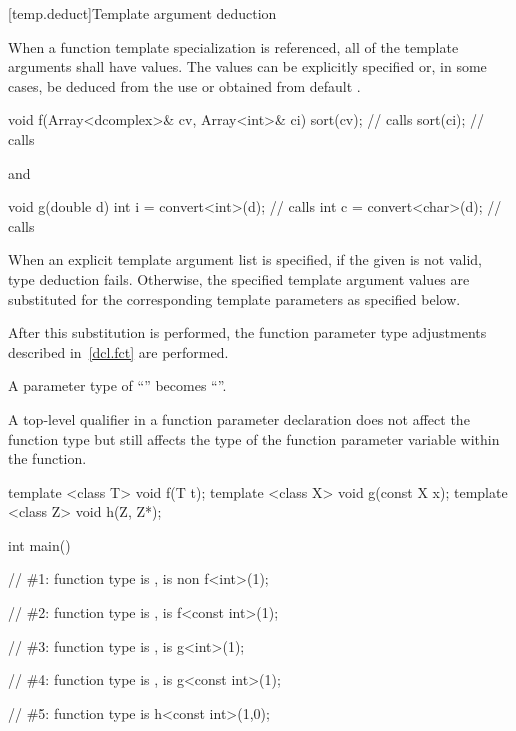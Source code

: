 [temp.deduct]{Template argument deduction}

\pnum
When a
function template
specialization is referenced, all of the
template arguments shall have values.
The values can be
explicitly specified or, in some cases, be deduced from the use
or obtained from default
.
\begin{example}
\begin{codeblock}
void f(Array<dcomplex>& cv, Array<int>& ci) {
  sort(cv);                     // calls 
  sort(ci);                     // calls 
}
\end{codeblock}
and
\begin{codeblock}
void g(double d) {
  int i = convert<int>(d);      // calls 
  int c = convert<char>(d);     // calls 
}
\end{codeblock}
\end{example}

\pnum
When an explicit template argument list is specified, if the
given  is not valid,
type deduction fails.
Otherwise, the specified template argument values are substituted for the
corresponding template parameters as specified below.

\pnum
After this substitution is performed, the function parameter type
adjustments described in~\ref{dcl.fct} are performed.
\begin{example}
A parameter type of ``'' becomes
``''.
\end{example}
\begin{note}
A top-level qualifier in a function parameter declaration does not affect
the function type but still affects the type of the function parameter
variable within the function.
\end{note}
\begin{example}

\begin{codeblock}
template <class T> void f(T t);
template <class X> void g(const X x);
template <class Z> void h(Z, Z*);

int main() {
  // \#1: function type is ,  is non 
  f<int>(1);

  // \#2: function type is ,  is 
  f<const int>(1);

  // \#3: function type is ,  is 
  g<int>(1);

  // \#4: function type is ,  is 
  g<const int>(1);

  // \#5: function type is 
  h<const int>(1,0);
}
\end{codeblock}
\end{example}

